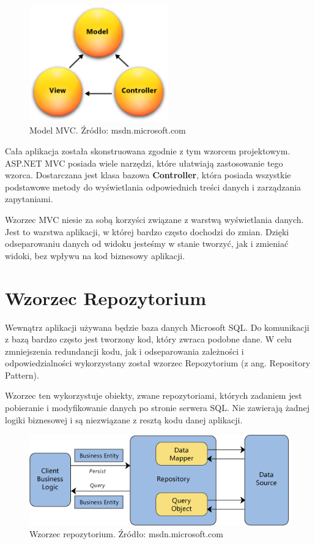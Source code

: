 \begin{figure}[h]
	\centering
	\includegraphics[height=50.5mm]{images/mvc.png}
	 \caption{Model MVC. Źródło: msdn.microsoft.com}
\end{figure}

Cała aplikacja została skonstruowana zgodnie z tym wzorcem projektowym. ASP.NET MVC posiada wiele narzędzi, które ułatwiają zastosowanie tego wzorca. Dostarczana jest klasa bazowa \textbf{Controller}, która posiada wszystkie podstawowe metody do wyświetlania odpowiednich treści danych i zarządzania zapytaniami.

Wzorzec MVC niesie za sobą korzyści związane z warstwą wyświetlania danych. Jest to warstwa aplikacji, w której bardzo często dochodzi do zmian. Dzięki odseparowaniu danych od widoku jesteśmy w stanie tworzyć, jak i zmieniać widoki, bez wpływu na kod biznesowy aplikacji.

\section{Wzorzec Repozytorium}

Wewnątrz aplikacji używana będzie baza danych Microsoft SQL. Do komunikacji z bazą bardzo często jest tworzony kod, który zwraca podobne dane. W celu zmniejszenia redundancji kodu, jak i odseparowania zależności i odpowiedzialności wykorzystany został wzorzec Repozytorium (z ang. Repository Pattern)\cite{RepositoryUnitOfWorkPattern}.

Wzorzec ten wykorzystuje obiekty, zwane repozytoriami, których zadaniem jest pobieranie i modyfikowanie danych po stronie serwera SQL. Nie zawierają żadnej logiki biznesowej i są niezwiązane z resztą kodu danej aplikacji. 

\begin{figure}[h]
	\centering
	\includegraphics[width=\textwidth]{images/RepositoryPattern.png}
	 \caption{Wzorzec repozytorium. Źródło: msdn.microsoft.com}
\end{figure}


